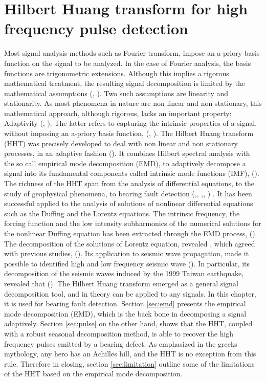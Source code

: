 \documentclass[../Main/thesis.tex]{subfiles}
\begin{document}
\chapter[Hilbert Huang transform for high frequency pulse detection]{Hilbert Huang transform for high frequency pulse detection}
\label{sec:hht}

Most signal analysis methods such as Fourier transform, impose an a-priory basis function on the signal to be analyzed. In the case of Fourier analysis, the basis functions are trigonometric extensions. Although this implies a rigorous mathematical treatment, the resulting signal decomposition is limited by the mathematical assumptions (\cite{huang98}, \cite{huang08}). Two such assumptions are linearity and stationarity. As most phenomena in nature are non linear and non stationary, this mathematical approach, although rigorous, lacks an important property: Adaptivity (\cite{huang98}, \cite{huang08}). The latter refers to capturing the intrinsic properties of a signal, without imposing an a-priory basis function, (\cite{huang98}, \cite{huang08}). 
\justify 
The Hilbert Huang transform (HHT) was precisely developed to deal with non linear and non stationary processes, in an adaptive fashion (\cite{huang98}). It combines Hilbert spectral analysis with the so call empirical mode decomposition (EMD), to adaptively decompose a signal into its fundamental components called intrinsic mode functions (IMF), (\cite{huang98}).
The richness of the HHT span from the analysis of differential equations, to the study of geophysical phenomena, to bearing fault detection (\cite{huang08},\cite{li2009}, \cite{yan2006} ,\cite{soualhi2015}, \cite{sallo2019}) .
\justify
 It has been successful applied to the analysis of solutions of nonlinear differential equations such as the Duffing and the Lorentz equations. The intrinsic frequency, the forcing function and the low intensity subharmonics of the numerical solutions for the nonlinear Duffing equation has been extracted through the EMD process, (\cite{huang98}). The decomposition of the solutions of Lorentz equation, revealed , which agreed with previous studies, (\cite{huang98}). Its application to seismic wave propagation, made it possible to identified high and low frequency seismic wave (\cite{vasudevan2000}). In particular, its decomposition of the seismic waves induced by the 1999 Taiwan earthquake, revealed that  (\cite{huang2001}). 
\justify
The Hilbert Huang transform emerged as a general signal decomposition tool, and in theory can be applied to any signals.
In this chapter, it is used for bearing fault detection. Section \ref{sec:emd} presents the empirical mode decomposition (EMD), which is the back bone in decomposing a signal adaptively. Section \ref{sec:pulse} on the other hand, shows that the HHT, coupled with a robust seasonal decomposition method, is able to recover the high frequency pulses emitted by a bearing defect. As emphasized in the greeks mythology, any hero has an Achilles hill, and the HHT is no exception from this rule. Therefore in closing, section \ref{sec:limitation} outline some of the limitations of the HHT based on the empirical mode decomposition.
\justify
\end{document}
